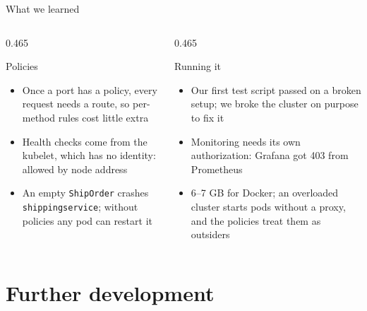 \documentclass[9pt,aspectratio=169]{beamer}
\begin{document}
\begin{frame}{What we learned}
  \vfill
  \begin{columns}[T,onlytextwidth]
    \begin{column}{0.465\textwidth}
      \begin{block}{Policies}
        \begin{itemize}\setlength{\itemsep}{9pt}
          \item Once a port has a policy, every request needs a route, so per-method rules cost little extra
          \item Health checks come from the kubelet, which has no identity: allowed by node address
          \item An empty \texttt{ShipOrder} crashes \texttt{shippingservice}; without policies any pod can restart it
        \end{itemize}
      \end{block}
    \end{column}
    \begin{column}{0.465\textwidth}
      \begin{block}{Running it}
        \begin{itemize}\setlength{\itemsep}{9pt}
          \item Our first test script passed on a broken setup; we broke the cluster on purpose to fix it
          \item Monitoring needs its own authorization: Grafana got 403 from Prometheus
          \item 6--7 GB for Docker; an overloaded cluster starts pods without a proxy, and the policies treat them as outsiders
        \end{itemize}
      \end{block}
    \end{column}
  \end{columns}
  \vfill
\end{frame}

\section{Further development}
\end{document}
